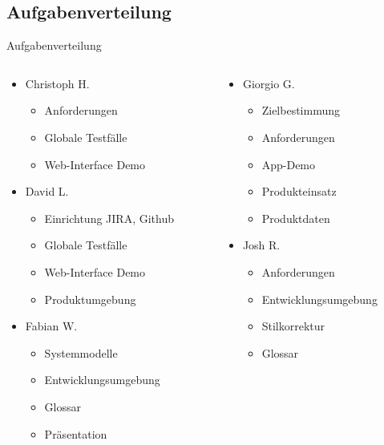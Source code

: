 \documentclass[19pt]{beamer}
\begin{document}
\subsection{Aufgabenverteilung}
\begin{frame}{Aufgabenverteilung}
  \begin{columns}[T]
    \begin{column}{.5\textwidth}
    		\begin{itemize}
    			\item Christoph H.
			\begin{itemize}
				\item Anforderungen
				\item Globale Testf\"alle
				\item Web-Interface Demo
			\end{itemize}
		\item David L.
			\begin{itemize}
				\item Einrichtung JIRA, Github				
				\item Globale Testf\"alle
				\item Web-Interface Demo
				\item Produktumgebung
			\end{itemize}
		\item Fabian W.
			\begin{itemize}
				\item Systemmodelle
				\item Entwicklungsumgebung
				\item Glossar
				\item Pr\"asentation
			\end{itemize}
    		\end{itemize}
    \end{column}
    \begin{column}{.5\textwidth}
    		\begin{itemize}
		\item Giorgio G.
			\begin{itemize}
				\item Zielbestimmung
				\item Anforderungen
				\item App-Demo
				\item Produkteinsatz
				\item Produktdaten
			\end{itemize}
		\item Josh R.
			\begin{itemize}
				\item Anforderungen
				\item Entwicklungsumgebung
				\item Stilkorrektur
				\item Glossar
			\end{itemize}
	\end{itemize}
    \end{column}
  \end{columns}
\end{frame}
\end{document}
